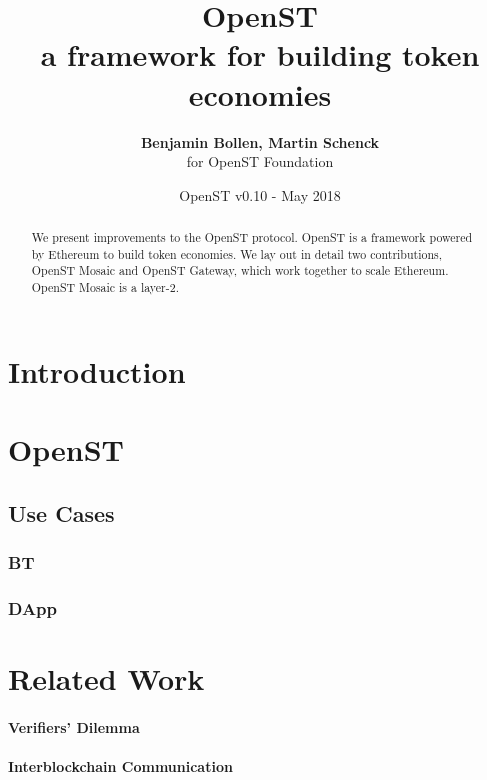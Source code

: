 \documentclass[12pt,a4paper,draft]{article}
\title{OpenST\\\sc\Large{a framework for building token economies}}
\author{\textbf{Benjamin Bollen, Martin Schenck}\\ for OpenST Foundation}
\date{OpenST v0.10 - May 2018}
\begin{document}
\maketitle

\begin{abstract}
We present improvements to the OpenST protocol.
OpenST is a framework powered by Ethereum to build token economies.
We lay out in detail two contributions, OpenST Mosaic and OpenST Gateway,
which work together to scale Ethereum. OpenST Mosaic is a layer-2.	
\end{abstract}

%
%
\section{Introduction}


%
%
\section{OpenST}

\subsection{Use Cases}

\subsubsection{BT}

\subsubsection{DApp}

%
%
\section{Related Work}

\paragraph{Verifiers' Dilemma}
\cite{verifiersdilemma}

\paragraph{Interblockchain Communication}
\cite{cosmos}
\end{document}
